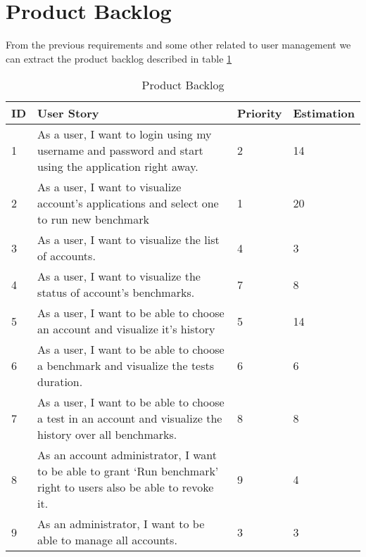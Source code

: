 \section{Product Backlog}
From the previous requirements and some other related to user management we can
extract the product backlog described in table \hyperref[product-backlog]{\ref{product-backlog}}

\begin{table}[!hp]
\caption{Product Backlog}
\label{product-backlog}
\centering
  \begin{tabular}{ | p{2cm}  | p{7cm}  | p{2cm} | p{2cm}| }
    \hline

    ID & User Story                                                                                                        & Priority        & Estimation\\ \hline

    1 & As a user, I want to login using my username and password and start using the application right away.              & 2              & 14        \\ \hline
    2 & As a user, I want to visualize account’s applications and select one to run new benchmark                          & 1              & 20        \\ \hline
    3 & As a user, I want to visualize the list of accounts.                                                               & 4              & 3        \\ \hline
    4 & As a user, I want to visualize the status of account’s benchmarks.                                                 & 7              & 8       \\ \hline
    5 & As a user, I want to be able to choose an account and visualize it’s history                                       & 5              & 14        \\ \hline
    6 & As a user, I want to be able to choose a benchmark and visualize the tests duration.                              & 6              & 6        \\ \hline
    7 & As a user, I want to be able to choose a test in an account and visualize the history over all benchmarks.         & 8              & 8       \\ \hline
    8 & As an account administrator, I want to be able to grant ‘Run benchmark’ right to users also be able to revoke it. & 9              & 4        \\ \hline
    9 & As an administrator, I want to be able to manage all accounts.                                                    & 3              & 3       \\ \hline

    \hline
  \end{tabular}
\end{table}

